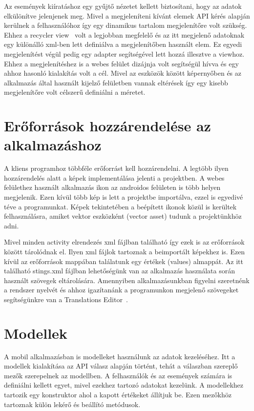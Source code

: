 \documentclass[
]{thesis-ekf}
\theoremstyle{definition}
\theoremstyle{remark}
\begin{document}
	Az események kiíratáshoz egy gyűjtő nézetet kellett biztosítani, hogy az adatok elkülönítve jelenjenek meg. Mivel a megjeleníteni kívánt elemek API kérés alapján kerülnek a felhasználóhoz így egy dinamikus tartalom megjelenítőre volt szükség. Ehhez a recycler view~\cite{android_recycler} volt a legjobban megfelelő és az itt megjelenő adatoknak egy különálló xml-ben lett definiálva a megjelenítőben használt elem. Ez egyedi megjelenítést végül pedig egy adapter segítségével lett hozzá illesztve a viewhoz. Ehhez a megjelenítéshez is a webes felület dizájnja volt segítségül hívva és egy ahhoz hasonló kialakítás volt a cél. Mivel az eszközök között képernyőben és az alkalmazás által használt kijelző felületben vannak eltérések így egy kisebb megjelenítőre volt célszerű definiálni a méretet.
	
	\section{Erőforrások hozzárendelése az alkalmazáshoz}
	A kliens programhoz többféle erőforrást kell hozzárendelni. A legtöbb ilyen hozzárendelés alatt a képek implementálása jelenti a projektben. A webes felülethez használt alkalmazás ikon az androidos felületen is több helyen megjelenik. Ezen kívül több kép is lett a projektbe importálva, ezzel is egyedivé téve a programunkat. Képek tekintetében a beépített ikonok közül is kerültek felhasználásra, amiket vektor eszközként (vector asset) tudunk a projektünkhöz adni.
	
	Mivel minden activity elrendezés xml fájlban található így ezek is az erőforrások között tárolódnak el. Ilyen xml fájlok tartoznak a beimportált képekhez is. Ezen kívül az erőforrások mappában találatunk egy értékek (values) almappát. Az itt található stings.xml fájlban lehetőségünk van az alkalmazás használata során használt szövegek eltárolására. Amennyiben alkalmazásunkban figyelni szeretnénk a rendszer nyelvét és ahhoz igazítanánk a programunkon megjelenő szövegeket segítségünkre van a Translations Editor~\cite{android_translations}. 
	
	\section{Modellek}
	A mobil alkalmazásban is modelleket használunk az adatok kezeléséhez. Itt a modellek kialakítása az API válasz alapján történt, tehát a válaszban szereplő mezők szerepelnek az modellben. A felhasználók és az események számára is definiálni kellett egyet, mivel ezekhez tartozó adatokat kezelünk. 
	A modellekhez tartozik egy konstruktor ahol a kapott értékeket állítjuk be. Ezen mezőkhöz tartoznak külön lekérő és beállító metódusok.
	
\end{document}
